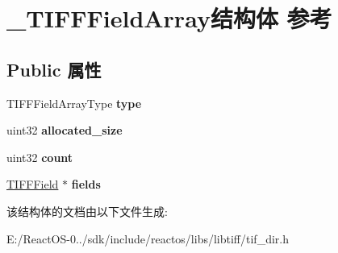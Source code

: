 \hypertarget{struct___t_i_f_f_field_array}{}\section{\+\_\+\+T\+I\+F\+F\+Field\+Array结构体 参考}
\label{struct___t_i_f_f_field_array}
\subsection*{Public 属性}
\begin{DoxyCompactItemize}
\item 
\mbox{\label{struct___t_i_f_f_field_array_a02dbf939bdfa30e2ec090fa9a4c9932f}} 
T\+I\+F\+F\+Field\+Array\+Type {\bfseries type}
\item 
\mbox{\label{struct___t_i_f_f_field_array_ac2695c7569683ec93340061a59939bba}} 
uint32 {\bfseries allocated\+\_\+size}
\item 
\mbox{\label{struct___t_i_f_f_field_array_ade7c978a8b2fe4b3e47b1709b82d2d29}} 
uint32 {\bfseries count}
\item 
\mbox{\label{struct___t_i_f_f_field_array_ab69a090ebe3b4c1cd988d89d9592958e}} 
\hyperlink{struct___t_i_f_f_field}{T\+I\+F\+F\+Field} $\ast$ {\bfseries fields}
\end{DoxyCompactItemize}


该结构体的文档由以下文件生成\+:\begin{DoxyCompactItemize}
\item 
E\+:/\+React\+O\+S-\/0../sdk/include/reactos/libs/libtiff/tif\+\_\+dir.\+h\end{DoxyCompactItemize}
